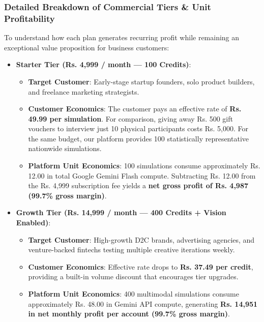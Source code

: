 \documentclass[11pt,a4paper]{article}
\begin{document}
\subsubsection{Detailed Breakdown of Commercial Tiers \& Unit Profitability}
To understand how each plan generates recurring profit while remaining an exceptional value proposition for business customers:
\begin{itemize}
  \item \textbf{Starter Tier (Rs. 4,999 / month --- 100 Credits)}:
  \begin{itemize}[noitemsep]
    \item \textbf{Target Customer}: Early-stage startup founders, solo product builders, and freelance marketing strategists.
    \item \textbf{Customer Economics}: The customer pays an effective rate of \textbf{Rs. 49.99 per simulation}. For comparison, giving away Rs. 500 gift vouchers to interview just 10 physical participants costs Rs. 5,000. For the same budget, our platform provides 100 statistically representative nationwide simulations.
    \item \textbf{Platform Unit Economics}: 100 simulations consume approximately Rs. 12.00 in total Google Gemini Flash compute. Subtracting Rs. 12.00 from the Rs. 4,999 subscription fee yields a \textbf{net gross profit of Rs. 4,987 (99.7\% gross margin)}.
  \end{itemize}

  \item \textbf{Growth Tier (Rs. 14,999 / month --- 400 Credits + Vision Enabled)}:
  \begin{itemize}[noitemsep]
    \item \textbf{Target Customer}: High-growth D2C brands, advertising agencies, and venture-backed fintechs testing multiple creative iterations weekly.
    \item \textbf{Customer Economics}: Effective rate drops to \textbf{Rs. 37.49 per credit}, providing a built-in volume discount that encourages tier upgrades.
    \item \textbf{Platform Unit Economics}: 400 multimodal simulations consume approximately Rs. 48.00 in Gemini API compute, generating \textbf{Rs. 14,951 in net monthly profit per account (99.7\% gross margin)}.
  \end{itemize}


\end{itemize}
\end{document}
